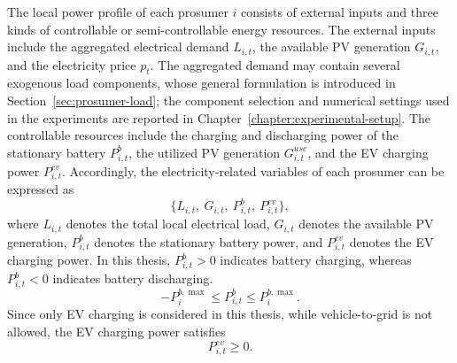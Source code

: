 The local power profile of each prosumer \(i\) consists of external inputs and three kinds of controllable or semi-controllable energy resources. The external inputs include the aggregated electrical demand \(L_{i,t}\), the available PV generation \(G_{i,t}\), and the electricity price \(p_t\). The aggregated demand may contain several exogenous load components, whose general formulation is introduced in Section~\ref{sec:prosumer-load}; the component selection and numerical settings used in the experiments are reported in Chapter~\ref{chapter:experimental-setup}.
The controllable resources include the charging and discharging power of the stationary battery \(P^b_{i,t}\), the utilized PV generation \(G^{use}_{i,t}\), and the EV charging power \(P^{ev}_{i,t}\). Accordingly, the electricity-related variables of each prosumer can be expressed as
\[
  \{L_{i,t},\ G_{i,t},\ P^{b}_{i,t},\ P^{ev}_{i,t}\},
\]
where \(L_{i,t}\) denotes the total local electrical load, \(G_{i,t}\) denotes the available PV generation, \(P^{b}_{i,t}\) denotes the stationary battery power, and \(P^{ev}_{i,t}\) denotes the EV charging power. In this thesis, \(P^{b}_{i,t}>0\) indicates battery charging, whereas \(P^{b}_{i,t}<0\) indicates battery discharging.
\[
  -P^{b,\max}_i \le P^b_{i,t} \le P^{b,\max}_i.
\]
Since only EV charging is considered in this thesis, while vehicle-to-grid is not allowed, the EV charging power satisfies
\[
  P^{ev}_{i,t}\ge 0.
\]

